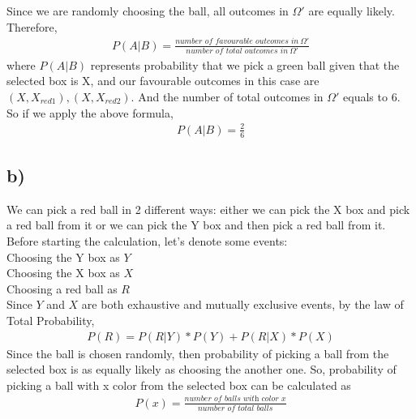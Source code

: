 \documentclass[12pt]{article}
\begin{document}
Since we are randomly choosing the ball, 
all outcomes in $\Omega'$ are equally likely. Therefore, 
\begin{equation*} 
\begin{split}
P(A|B) = \frac{\textit{number of favourable outcomes in}\ \Omega'}{\textit{number of total outcomes in}\ \Omega'}
\end{split}
\end{equation*}
where $P(A|B)$ represents probability that we pick a green ball given that the selected box is X, and our favourable outcomes in this case are $(X,X_{red1}),(X,X_{red2})$. And the number of total outcomes in $\Omega'$ equals to 6. So if we apply the above formula,
\begin{equation*} 
\begin{split}
P(A|B) = \frac{2}{6} 
\end{split}
\end{equation*}

\subsection*{b)} We can pick a red ball in 2 different ways: either we can pick the X box and pick a red ball from it or we can pick the Y box and then pick a red ball from it. Before starting the calculation, let's denote some events: \\
Choosing the Y box as $Y$ \\
Choosing the X box as $X$ \\
Choosing a red ball as $R$ \\
Since $Y$ and $X$ are both exhaustive and mutually exclusive events, by the law of Total Probability,
\begin{equation} 
\begin{split}
P(R) = P(R|Y)*P(Y) + P(R|X)*P(X)
\end{split}
\end{equation}
Since the ball is chosen randomly, then probability of picking a ball from the selected box is as equally likely as choosing the another one. So, probability of picking a ball with x color from the selected box can be calculated as
\begin{equation} 
\begin{split}
P(x) = \frac{\textit{number of balls with color x}}{\textit{number of total balls}}
\end{split}
\end{equation}
\end{document}

